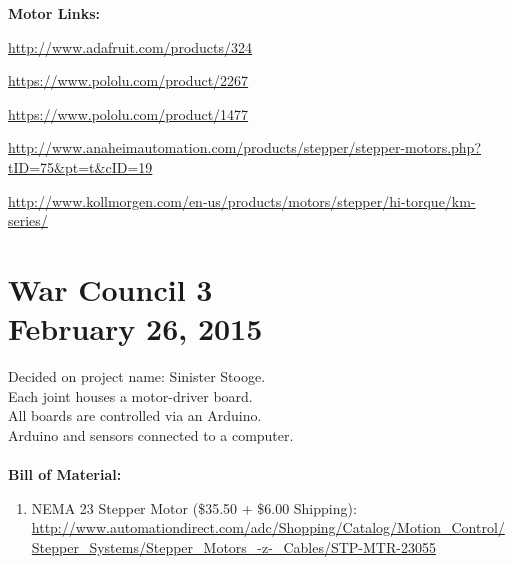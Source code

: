 \documentclass[11pt]{article}
\begin{document}

\noindent \textbf{Motor Links:}
\begin{compactitem}
	\item \url{http://www.adafruit.com/products/324}
	\item \url{https://www.pololu.com/product/2267}
	\item \url{https://www.pololu.com/product/1477}
	\item \url{http://www.anaheimautomation.com/products/stepper/stepper-motors.php?tID=75&pt=t&cID=19}
	\item \url{http://www.kollmorgen.com/en-us/products/motors/stepper/hi-torque/km-series/}
\end{compactitem}


\section{War Council 3 \\ February 26, 2015}
Decided on project name: Sinister Stooge.\\
Each joint houses a motor-driver board.\\
All boards are controlled via an Arduino.\\
Arduino and sensors connected to a computer.\\
\\
\noindent \textbf{Bill of Material:}\\
\begin{enumerate}
	\item NEMA 23 Stepper Motor (\$35.50 + \$6.00 Shipping): \url{http://www.automationdirect.com/adc/Shopping/Catalog/Motion_Control/Stepper_Systems/Stepper_Motors_-z-_Cables/STP-MTR-23055}
\end{enumerate}
\end{document}
